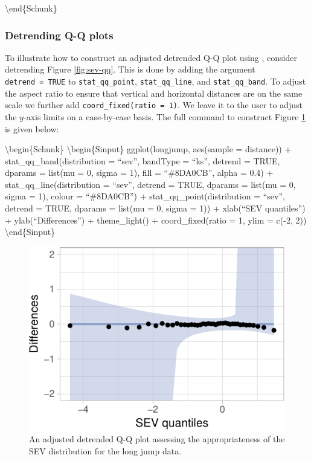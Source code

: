 \textbackslash{}end\{Schunk\}

\FloatBarrier

\hypertarget{detrending-q-q-plots}{%
\subsubsection{Detrending Q-Q plots}\label{detrending-q-q-plots}}

\label{sec:detrending}

To illustrate how to construct an adjusted detrended Q-Q plot using
, consider detrending Figure \ref{fig:sev-qq}. This is done
by adding the argument \texttt{detrend\ =\ TRUE} to
\texttt{stat\_qq\_point}, \texttt{stat\_qq\_line}, and
\texttt{stat\_qq\_band}. To adjust the aspect ratio to ensure that
vertical and horizontal distances are on the same scale we further add
\texttt{coord\_fixed(ratio\ =\ 1)}. We leave it to the user to adjust
the \(y\)-axis limits on a case-by-case basis. The full command to
construct Figure \ref{fig:detrend-sev} is given below:

\textbackslash{}begin\{Schunk\} \textbackslash{}begin\{Sinput\}
ggplot(longjump, aes(sample = distance)) + stat\_qq\_band(distribution =
``sev'', bandType = ``ks'', detrend = TRUE, dparams = list(mu = 0, sigma
= 1), fill = ``\#8DA0CB'', alpha = 0.4) + stat\_qq\_line(distribution =
``sev'', detrend = TRUE, dparams = list(mu = 0, sigma = 1), colour =
``\#8DA0CB'') + stat\_qq\_point(distribution = ``sev'', detrend = TRUE,
dparams = list(mu = 0, sigma = 1)) + xlab(``SEV quantiles'') +
ylab(``Differences'') + theme\_light() + coord\_fixed(ratio = 1, ylim =
c(-2, 2)) \textbackslash{}end\{Sinput\}

\begin{figure}

{\centering \includegraphics[width=0.45\linewidth]{loy-figures/detrend-sev-1} 

}

\caption[An adjusted detrended Q-Q plot assessing the appropriateness of the SEV distribution for the long jump data]{An adjusted detrended Q-Q plot assessing the appropriateness of the SEV distribution for the long jump data.}\label{fig:detrend-sev}
\end{figure}

